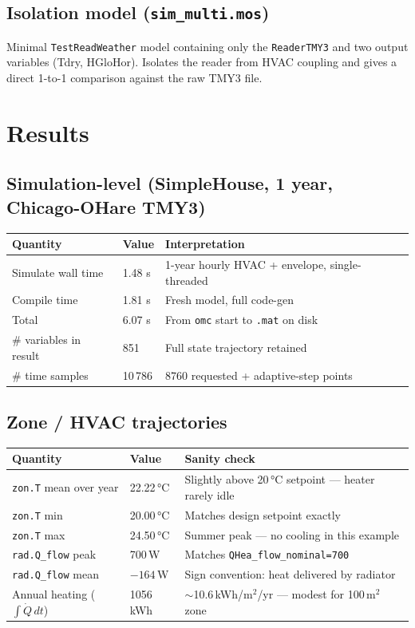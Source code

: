 \documentclass[11pt]{article}
\begin{document}
\subsection{Isolation model (\texttt{sim\_multi.mos})}
Minimal \texttt{TestReadWeather} model containing only the
\texttt{ReaderTMY3} and two output variables (Tdry, HGloHor). Isolates
the reader from HVAC coupling and gives a direct 1-to-1 comparison
against the raw TMY3 file.

\section{Results}

\subsection{Simulation-level (SimpleHouse, 1 year, Chicago-OHare TMY3)}
\begin{tabular}{lll}
\toprule
Quantity & Value & Interpretation \\
\midrule
Simulate wall time & 1.48 s & 1-year hourly HVAC + envelope, single-threaded \\
Compile time      & 1.81 s & Fresh model, full code-gen \\
Total             & 6.07 s & From \texttt{omc} start to \texttt{.mat} on disk \\
\# variables in result & 851 & Full state trajectory retained \\
\# time samples & 10\,786 & 8760 requested + adaptive-step points \\
\bottomrule
\end{tabular}

\subsection{Zone / HVAC trajectories}
\begin{tabular}{lll}
\toprule
Quantity & Value & Sanity check \\
\midrule
\texttt{zon.T} mean over year & 22.22\,\si{\celsius} & Slightly above 20\,\si{\celsius} setpoint --- heater rarely idle \\
\texttt{zon.T} min            & 20.00\,\si{\celsius} & Matches design setpoint exactly \\
\texttt{zon.T} max            & 24.50\,\si{\celsius} & Summer peak --- no cooling in this example \\
\texttt{rad.Q\_flow} peak     & 700\,W & Matches \texttt{QHea\_flow\_nominal=700} \\
\texttt{rad.Q\_flow} mean     & $-164$\,W & Sign convention: heat delivered by radiator \\
Annual heating ($\int \dot Q\, dt$) & 1056\,kWh & \(\sim\)10.6\,kWh/m$^2$/yr --- modest for 100\,m$^2$ zone \\
\bottomrule
\end{tabular}
\end{document}
